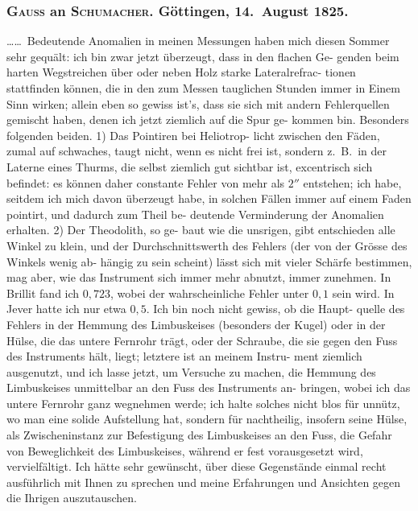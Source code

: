 \documentclass[12pt,a4paper]{article}
\theoremstyle{plain}
\theoremstyle{definition}
\theoremstyle{remark}
\begin{document}
\newpage
\subsubsection*{\textsc{Gauss} an \textsc{Schumacher}. Göttingen, 14.\ August 1825.}

\ldots\ldots\ Bedeutende Anomalien in meinen Messungen haben mich diesen
Sommer sehr gequält: ich bin zwar jetzt überzeugt, dass in den flachen Ge-
genden beim harten Wegstreichen über oder neben Holz starke Lateralrefrac-
tionen stattfinden können, die in den zum Messen tauglichen Stunden immer
in Einem Sinn wirken; allein eben so gewiss ist's, dass sie sich mit andern
Fehlerquellen gemischt haben, denen ich jetzt ziemlich auf die Spur ge-
kommen bin. Besonders folgenden beiden. 1) Das Pointiren bei Heliotrop-
licht zwischen den Fäden, zumal auf schwaches, taugt nicht, wenn es nicht
frei ist, sondern z.\ B.\ in der Laterne eines Thurms, die selbst ziemlich gut
sichtbar ist, excentrisch sich befindet: es können daher constante Fehler von
mehr als $2''$ entstehen; ich habe, seitdem ich mich davon überzeugt habe, in
solchen Fällen immer auf einem Faden pointirt, und dadurch zum Theil be-
deutende Verminderung der Anomalien erhalten. 2) Der Theodolith, so ge-
baut wie die unsrigen, gibt entschieden alle Winkel zu klein, und der
Durchschnittswerth des Fehlers (der von der Grösse des Winkels wenig ab-
hängig zu sein scheint) lässt sich mit vieler Schärfe bestimmen, mag aber,
wie das Instrument sich immer mehr abnutzt, immer zunehmen. In Brillit
fand ich $0{,}723$, wobei der wahrscheinliche Fehler unter $0{,}1$ sein wird. In
Jever hatte ich nur etwa $0{,}5$. Ich bin noch nicht gewiss, ob die Haupt-
quelle des Fehlers in der Hemmung des Limbuskeises (besonders der Kugel)
oder in der Hülse, die das untere Fernrohr trägt, oder der Schraube, die sie
gegen den Fuss des Instruments hält, liegt; letztere ist an meinem Instru-
ment ziemlich ausgenutzt, und ich lasse jetzt, um Versuche zu machen, die
Hemmung des Limbuskeises unmittelbar an den Fuss des Instruments an-
bringen, wobei ich das untere Fernrohr ganz wegnehmen werde; ich halte
solches nicht blos für unnütz, wo man eine solide Aufstellung hat, sondern
für nachtheilig, insofern seine Hülse, als Zwischeninstanz zur Befestigung des
Limbuskeises an den Fuss, die Gefahr von Beweglichkeit des Limbuskeises,
während er fest vorausgesetzt wird, vervielfältigt. Ich hätte sehr gewünscht,
über diese Gegenstände einmal recht ausführlich mit Ihnen zu sprechen und
meine Erfahrungen und Ansichten gegen die Ihrigen auszutauschen.
\end{document}
